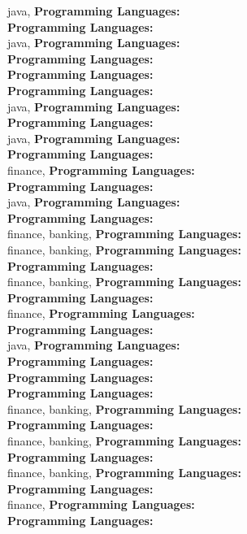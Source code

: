 java, \textbf{Programming Languages:} \\
\textbf{Programming Languages:} \\
java, \textbf{Programming Languages:} \\
\textbf{Programming Languages:} \\
\textbf{Programming Languages:} \\
\textbf{Programming Languages:} \\
java, \textbf{Programming Languages:} \\
\textbf{Programming Languages:} \\
java, \textbf{Programming Languages:} \\
\textbf{Programming Languages:} \\
finance, \textbf{Programming Languages:} \\
\textbf{Programming Languages:} \\
java, \textbf{Programming Languages:} \\
\textbf{Programming Languages:} \\
finance, banking, \textbf{Programming Languages:} \\
finance, banking, \textbf{Programming Languages:} \\
\textbf{Programming Languages:} \\
finance, banking, \textbf{Programming Languages:} \\
\textbf{Programming Languages:} \\
finance, \textbf{Programming Languages:} \\
\textbf{Programming Languages:} \\
java, \textbf{Programming Languages:} \\
\textbf{Programming Languages:} \\
\textbf{Programming Languages:} \\
\textbf{Programming Languages:} \\
finance, banking, \textbf{Programming Languages:} \\
\textbf{Programming Languages:} \\
finance, banking, \textbf{Programming Languages:} \\
\textbf{Programming Languages:} \\
finance, banking, \textbf{Programming Languages:} \\
\textbf{Programming Languages:} \\
finance, \textbf{Programming Languages:} \\
\textbf{Programming Languages:} \\
